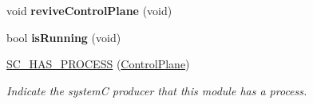 \begin{DoxyCompactItemize}
\item 
\hypertarget{classControlPlane_a0b791170af33147760ae97cec79dfe68}{void {\bfseries revive\-Control\-Plane} (void)}\label{classControlPlane_a0b791170af33147760ae97cec79dfe68}

\item 
\hypertarget{classControlPlane_aad1a701de61f52e2827a37250ec35048}{bool {\bfseries is\-Running} (void)}\label{classControlPlane_aad1a701de61f52e2827a37250ec35048}

\item 
\hyperlink{classControlPlane_a1ea8212be6d995f37ea9bc42c0f0adc2}{S\-C\-\_\-\-H\-A\-S\-\_\-\-P\-R\-O\-C\-E\-S\-S} (\hyperlink{classControlPlane}{Control\-Plane})
\begin{DoxyCompactList}\small\item\em Indicate the system\-C producer that this module has a process. \end{DoxyCompactList}\end{DoxyCompactItemize}
